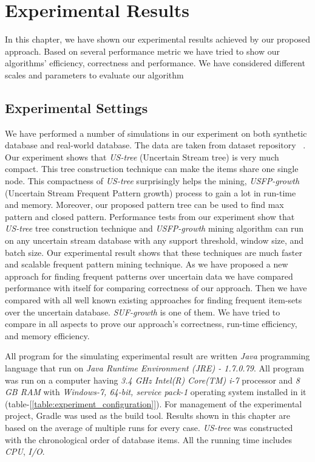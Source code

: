 %
\chapter{Experimental Results}
In this chapter, we have shown our experimental results achieved by our proposed approach. Based on several performance metric we have tried to show our algorithms' efficiency, correctness and performance. We have considered different scales and parameters to evaluate our algorithm


\section{Experimental Settings}
We have performed a number of simulations in our experiment on both synthetic database and real-world database. The data are taken from dataset repository ~\cite{dataset}. Our experiment shows that \emph{US-tree} (Uncertain Stream tree) is very much compact. This tree construction technique can make the items share one single node. This compactness of \emph{US-tree} surprisingly helps the mining, \emph{USFP-growth} (Uncertain Stream Frequent Pattern growth) process to gain a lot in run-time and memory. Moreover, our proposed pattern tree can be used to find max pattern and closed pattern. Performance tests from our experiment show that \emph{US-tree} tree construction technique and \emph{USFP-growth} mining algorithm can run on any uncertain stream database with any support threshold, window size, and batch size. Our experimental result shows that these techniques are much faster and scalable frequent pattern mining technique. As we have proposed a new approach for finding frequent patterns over uncertain data we have compared performance with itself for comparing correctness of our approach. Then we have compared with all well known existing approaches for finding frequent item-sets over the uncertain database. \emph{SUF-growth} is one of them. We have tried to compare in all aspects to prove our approach's correctness, run-time efficiency, and memory efficiency.

All program for the simulating experimental result are written \emph{Java} programming language that run on \emph{Java Runtime Environment (JRE) - 1.7.0.79}. All program was run on a computer having \emph{3.4 GHz Intel(R) Core(TM) i-7} processor and \emph{8 GB RAM} with \emph{Windows-7, 64-bit, service pack-1} operating system installed in it (table-[\ref{table:experiment_configuration}]). For management of the experimental project, Gradle was used as the build tool. Results shown in this chapter are based on the average of multiple runs for every case. \emph{US-tree} was constructed with the chronological order of database items. All the running time includes \emph{CPU}, \emph{I/O}.\\
